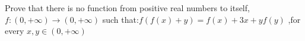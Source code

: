 Prove that there is no function from positive real numbers to itself, $f : (0,+\infty)\to(0,+\infty)$ such that:$f(f(x) + y) = f(x) + 3x + yf(y)$ ,for every $x,y \in (0,+\infty)$
